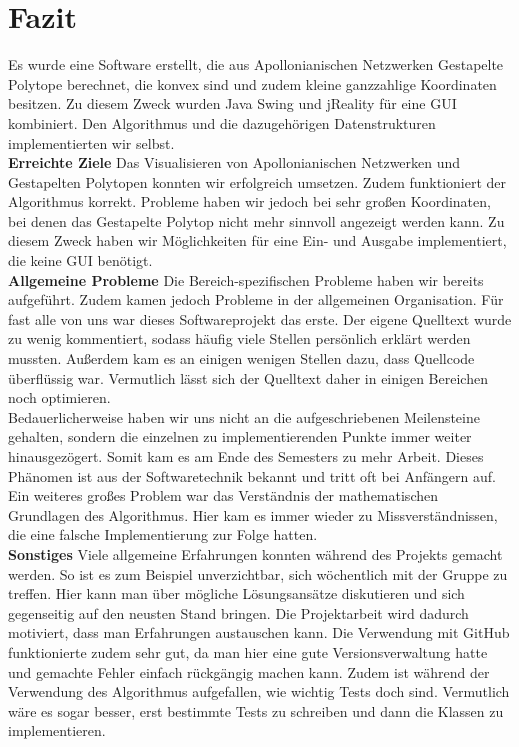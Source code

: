 \section*{Fazit}
Es wurde eine Software erstellt, die aus Apollonianischen Netzwerken Gestapelte Polytope berechnet, die konvex sind und zudem kleine ganzzahlige Koordinaten besitzen. Zu diesem Zweck wurden Java Swing und jReality für eine GUI kombiniert. Den Algorithmus und die dazugehörigen Datenstrukturen implementierten wir selbst.\\

\textbf{Erreichte Ziele} Das Visualisieren von Apollonianischen Netzwerken und Gestapelten Polytopen konnten wir erfolgreich umsetzen. Zudem funktioniert der Algorithmus korrekt. Probleme haben wir jedoch bei sehr großen Koordinaten, bei denen das Gestapelte Polytop nicht mehr sinnvoll angezeigt werden kann. Zu diesem Zweck haben wir Möglichkeiten für eine Ein- und Ausgabe implementiert, die keine GUI benötigt.\\

\textbf{Allgemeine Probleme} Die Bereich-spezifischen Probleme haben wir bereits aufgeführt. Zudem kamen jedoch Probleme in der allgemeinen Organisation. Für fast alle von uns war dieses Softwareprojekt das erste. Der eigene Quelltext wurde zu wenig kommentiert, sodass häufig viele Stellen persönlich erklärt werden mussten. Außerdem kam es an einigen wenigen Stellen dazu, dass Quellcode überflüssig war. Vermutlich lässt sich der Quelltext daher in einigen Bereichen noch optimieren.\\ Bedauerlicherweise haben wir uns nicht an die aufgeschriebenen Meilensteine gehalten, sondern die einzelnen zu implementierenden Punkte immer weiter hinausgezögert. Somit kam es am Ende des Semesters zu mehr Arbeit. Dieses Phänomen ist aus der Softwaretechnik bekannt und tritt oft bei Anfängern auf.\\
Ein weiteres großes Problem war das Verständnis der mathematischen Grundlagen des Algorithmus. Hier kam es immer wieder zu Missverständnissen, die eine falsche Implementierung zur Folge hatten.\\

\textbf{Sonstiges} Viele allgemeine Erfahrungen konnten während des Projekts gemacht werden. So ist es zum Beispiel unverzichtbar, sich wöchentlich mit der Gruppe zu treffen. Hier kann man über mögliche Lösungsansätze diskutieren und sich gegenseitig auf den neusten Stand bringen. Die Projektarbeit wird dadurch motiviert, dass man Erfahrungen austauschen kann. Die Verwendung mit GitHub funktionierte zudem sehr gut, da man hier eine gute Versionsverwaltung hatte und gemachte Fehler einfach rückgängig machen kann. Zudem ist während der Verwendung des Algorithmus aufgefallen, wie wichtig Tests doch sind. Vermutlich wäre es sogar besser, erst bestimmte Tests zu schreiben und dann die Klassen zu implementieren.


